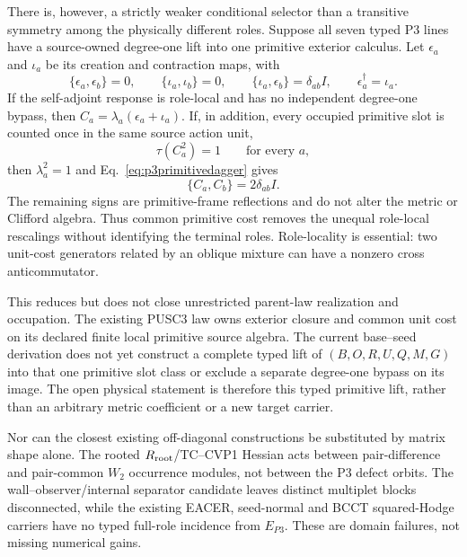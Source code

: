 \documentclass[11pt]{article}
\begin{document}
There is, however, a strictly weaker conditional selector than a transitive
symmetry among the physically different roles.  Suppose all seven typed P3
lines have a source-owned degree-one lift into one primitive exterior
calculus.  Let $\epsilon_a$ and $\iota_a$ be its creation and contraction
maps, with
\begin{equation}
\{\epsilon_a,\epsilon_b\}=0,\qquad
\{\iota_a,\iota_b\}=0,\qquad
\{\iota_a,\epsilon_b\}=\delta_{ab}I,\qquad
\epsilon_a^\dagger=\iota_a.
\label{eq:p3primitivedagger}
\end{equation}
If the self-adjoint response is role-local and has no independent
degree-one bypass, then
$C_a=\lambda_a(\epsilon_a+\iota_a)$.  If, in addition, every occupied
primitive slot is counted once in the same source action unit,
\begin{equation}
\tau(C_a^2)=1\qquad\text{for every }a,
\label{eq:p3primitiveunitcost}
\end{equation}
then $\lambda_a^2=1$ and Eq.~\eqref{eq:p3primitivedagger} gives
\begin{equation}
\boxed{\{C_a,C_b\}=2\delta_{ab}I.}
\label{eq:p3primitiveselector}
\end{equation}
The remaining signs are primitive-frame reflections and do not alter the
metric or Clifford algebra.  Thus common primitive cost removes the unequal
role-local rescalings without identifying the terminal roles.  Role-locality
is essential: two unit-cost generators related by an oblique mixture can
have a nonzero cross anticommutator.

This reduces but does not close unrestricted parent-law realization and
occupation.  The existing PUSC3 law
owns exterior closure and common unit cost on its declared finite local
primitive source algebra.  The current base--seed derivation does not yet
construct a complete typed lift of $(B,O,R,U,Q,M,G)$ into that one primitive
slot class or exclude a separate degree-one bypass on its image.  The open
physical statement is therefore this typed primitive lift, rather than an
arbitrary metric coefficient or a new target carrier.

Nor can the closest existing off-diagonal constructions be substituted by
matrix shape alone.  The rooted $R_{\rm root}$/TC--CVP1 Hessian acts between
pair-difference and pair-common $W_2$ occurrence modules, not between the P3
defect orbits.  The wall--observer/internal separator candidate leaves
distinct multiplet blocks disconnected, while the existing EACER,
seed-normal and BCCT squared-Hodge carriers have no typed full-role incidence
from $E_{P3}$.  These are domain failures, not missing numerical gains.
\end{document}
